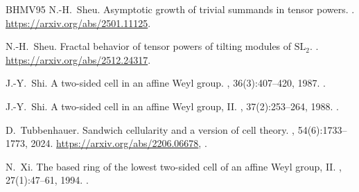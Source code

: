 \documentclass[a4paper,11pt]{amsart}
\numberwithin{equation}{subsection}
\theoremstyle{definition}
\theoremstyle{remark}
\begin{document}
\begin{thebibliography}{BHMV95}
N.-H.~Sheu.
\newblock Asymptotic growth of trivial summands in tensor powers.
.
\newblock \url{https://arxiv.org/abs/2501.11125}.

N.-H.~Sheu.
\newblock Fractal behavior of tensor powers of tilting modules of
\(\mathrm{SL}_2\).
.
\newblock \url{https://arxiv.org/abs/2512.24317}.

J.-Y.~Shi.
\newblock A two-sided cell in an affine Weyl group.
, 36(3):407--420, 1987.
\newblock \href{https://doi.org/10.1112/jlms/s2-36.3.407}{}.

J.-Y.~Shi.
\newblock A two-sided cell in an affine Weyl group, II.
, 37(2):253--264, 1988.
\newblock \href{https://doi.org/10.1112/jlms/s2-37.2.253}{}.

D.~Tubbenhauer.
\newblock Sandwich cellularity and a version of cell theory.
, 54(6):1733--1773, 2024.
\newblock \url{https://arxiv.org/abs/2206.06678}, \href{https://doi.org/10.1216/rmj.2024.54.1733}{}.

N.~Xi.
\newblock The based ring of the lowest two-sided cell of an affine Weyl group, II.
, 27(1):47--61, 1994.
\newblock \href{https://doi.org/10.24033/asens.1688}{}.

\end{thebibliography}
\end{document}
